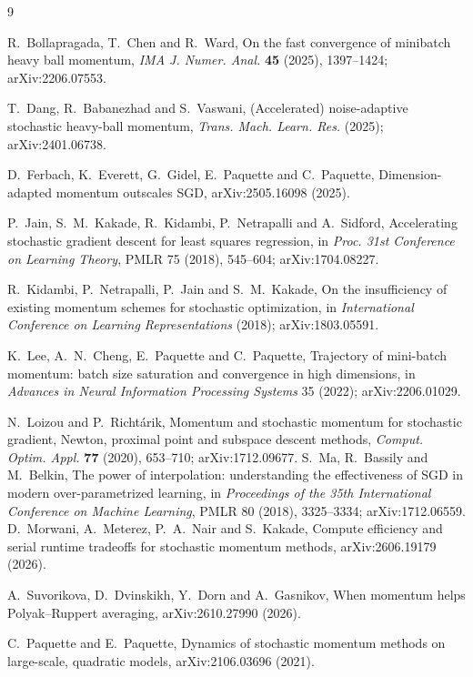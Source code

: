 \documentclass[11pt]{amsart}
\theoremstyle{definition}
\theoremstyle{remark}
\numberwithin{equation}{section}
\begin{document}
\begin{thebibliography}{9}

R.~Bollapragada, T.~Chen and R.~Ward, On the fast convergence of minibatch heavy ball momentum, \emph{IMA J. Numer. Anal.} \textbf{45} (2025), 1397--1424; arXiv:2206.07553.

T.~Dang, R.~Babanezhad and S.~Vaswani, (Accelerated) noise-adaptive stochastic heavy-ball momentum, \emph{Trans. Mach. Learn. Res.} (2025); arXiv:2401.06738.

D.~Ferbach, K.~Everett, G.~Gidel, E.~Paquette and C.~Paquette, Dimension-adapted momentum outscales SGD, arXiv:2505.16098 (2025).

P.~Jain, S.~M.~Kakade, R.~Kidambi, P.~Netrapalli and A.~Sidford, Accelerating stochastic gradient descent for least squares regression, in \emph{Proc. 31st Conference on Learning Theory}, PMLR 75 (2018), 545--604; arXiv:1704.08227.

R.~Kidambi, P.~Netrapalli, P.~Jain and S.~M.~Kakade, On the insufficiency of existing momentum schemes for stochastic optimization, in \emph{International Conference on Learning Representations} (2018); arXiv:1803.05591.

K.~Lee, A.~N.~Cheng, E.~Paquette and C.~Paquette, Trajectory of mini-batch momentum: batch size saturation and convergence in high dimensions, in \emph{Advances in Neural Information Processing Systems} 35 (2022); arXiv:2206.01029.

N.~Loizou and P.~Richt\'arik, Momentum and stochastic momentum for stochastic gradient, Newton, proximal point and subspace descent methods, \emph{Comput. Optim. Appl.} \textbf{77} (2020), 653--710; arXiv:1712.09677.
S.~Ma, R.~Bassily and M.~Belkin, The power of interpolation: understanding the effectiveness of SGD in modern over-parametrized learning, in \emph{Proceedings of the 35th International Conference on Machine Learning}, PMLR 80 (2018), 3325--3334; arXiv:1712.06559.
D.~Morwani, A.~Meterez, P.~A.~Nair and S.~Kakade, Compute efficiency and serial runtime tradeoffs for stochastic momentum methods, arXiv:2606.19179 (2026).

A.~Suvorikova, D.~Dvinskikh, Y.~Dorn and A.~Gasnikov, When momentum helps Polyak--Ruppert averaging, arXiv:2610.27990 (2026).

C.~Paquette and E.~Paquette, Dynamics of stochastic momentum methods on large-scale, quadratic models, arXiv:2106.03696 (2021).


\end{thebibliography}
\end{document}
